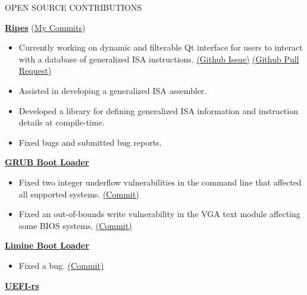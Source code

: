 \documentclass{resume} %
\begin{document}
\begin{rSection}{OPEN SOURCE CONTRIBUTIONS}
	
	\vspace{-1.25em}
	\item
	\href{https://github.com/mortbopet/Ripes}{\textbf{Ripes}}
	(\href{https://github.com/mortbopet/Ripes/commits/master/?author=raccog}{My Commits})
	\vspace{-.75em}
	\begin{itemize}
		\itemsep -8pt{}
		\item Currently working on dynamic and filterable Qt interface for users to interact with a database of generalized ISA instructions.
		\href{https://github.com/mortbopet/Ripes/issues/297}{(Github Issue)}
		\href{https://github.com/mortbopet/Ripes/pull/329}{(Github Pull Request)}
		\item Assisted in developing a generalized ISA assembler.
		\item Developed a library for defining generalized ISA information and instruction details at compile-time.
		\item Fixed bugs and submitted bug reports.
	\end{itemize}
	\vspace{-.75em}
	\item  \href{https://git.savannah.gnu.org/cgit/grub.git}{\textbf{GRUB Boot Loader}}
	\vspace{-.75em}
	\begin{itemize}
		\itemsep -8pt{}
		\item Fixed two integer underflow vulnerabilities in the command line that affected all supported systems.
		\href{https://git.savannah.gnu.org/gitweb/?p=grub.git;a=commit;h=77afd25f8065bfbf5cc7848855006cd5260aeb9f}{(Commit)}
		\item Fixed an out-of-bounds write vulnerability in the VGA text module affecting some BIOS systems.
		\href{https://git.savannah.gnu.org/gitweb/?p=grub.git;a=commit;h=108a3865f43330b581d35b9cf6ecb1e0a1da5d49}{(Commit)}
	\end{itemize}
	\vspace{-.75em}
	\item \href{https://github.com/limine-bootloader/limine}{\textbf{Limine Boot Loader}}
	\vspace{-.75em}
	\begin{itemize}
		\itemsep -8pt{}
		\item Fixed a bug. \href{https://github.com/limine-bootloader/limine/commit/07d8dd2c68aea2bd4a03e8b69a521c67abc1d618}{(Commit)}
	\end{itemize}
	\vspace{-.75em}
	\item \href{https://github.com/rust-osdev/uefi-rs}{\textbf{UEFI-rs}}
	\vspace{-.75em}
	\begin{itemize}
		\itemsep -8pt{}
	

\end{itemize}
\end{rSection}
\end{document}
